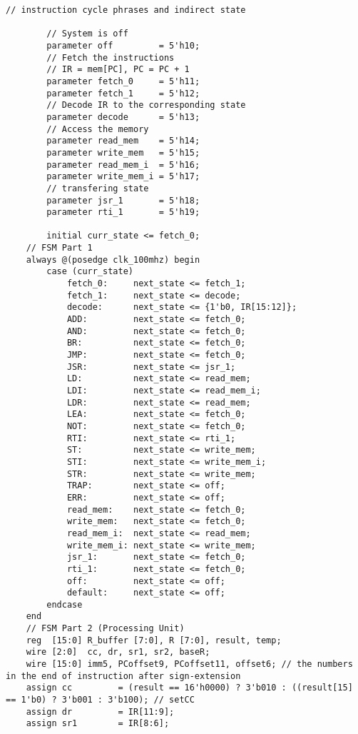\documentclass[UTF8,fontset=fandol]{ctexart}
\begin{document}
\begin{lstlisting}[style = verilogstyle, caption = 模块文件源代码, label = Code:Source, breaklines = true]
        // instruction cycle phrases and indirect state
        
        // System is off
        parameter off         = 5'h10;
        // Fetch the instructions
        // IR = mem[PC], PC = PC + 1
        parameter fetch_0     = 5'h11;
        parameter fetch_1     = 5'h12;
        // Decode IR to the corresponding state
        parameter decode      = 5'h13;
        // Access the memory
        parameter read_mem    = 5'h14;
        parameter write_mem   = 5'h15;
        parameter read_mem_i  = 5'h16;
        parameter write_mem_i = 5'h17;
        // transfering state
        parameter jsr_1       = 5'h18;
        parameter rti_1       = 5'h19;
        
        initial curr_state <= fetch_0;
    // FSM Part 1
    always @(posedge clk_100mhz) begin
        case (curr_state)
            fetch_0:     next_state <= fetch_1;
            fetch_1:     next_state <= decode;
            decode:      next_state <= {1'b0, IR[15:12]};
            ADD:         next_state <= fetch_0;
            AND:         next_state <= fetch_0;
            BR:          next_state <= fetch_0;
            JMP:         next_state <= fetch_0;
            JSR:         next_state <= jsr_1;
            LD:          next_state <= read_mem;
            LDI:         next_state <= read_mem_i;
            LDR:         next_state <= read_mem;
            LEA:         next_state <= fetch_0;
            NOT:         next_state <= fetch_0;
            RTI:         next_state <= rti_1;
            ST:          next_state <= write_mem;
            STI:         next_state <= write_mem_i;
            STR:         next_state <= write_mem;
            TRAP:        next_state <= off;
            ERR:         next_state <= off;
            read_mem:    next_state <= fetch_0;
            write_mem:   next_state <= fetch_0;
            read_mem_i:  next_state <= read_mem;
            write_mem_i: next_state <= write_mem;
            jsr_1:       next_state <= fetch_0;
            rti_1:       next_state <= fetch_0;
            off:         next_state <= off;
            default:     next_state <= off;
        endcase
    end
    // FSM Part 2 (Processing Unit)
    reg  [15:0] R_buffer [7:0], R [7:0], result, temp;
    wire [2:0]  cc, dr, sr1, sr2, baseR;
    wire [15:0] imm5, PCoffset9, PCoffset11, offset6; // the numbers in the end of instruction after sign-extension
    assign cc         = (result == 16'h0000) ? 3'b010 : ((result[15] == 1'b0) ? 3'b001 : 3'b100); // setCC
    assign dr         = IR[11:9];
    assign sr1        = IR[8:6];

\end{lstlisting}
\end{document}
